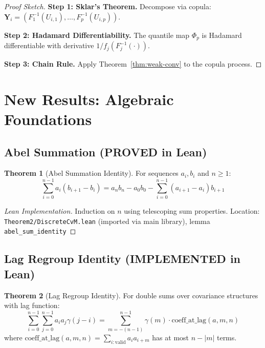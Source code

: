 \documentclass[final,3p,twocolumn,times,authoryear]{elsarticle}
\theoremstyle{definition}
\newtheorem{theorem}{Theorem}[section]
\begin{document}
\begin{proof}[Proof Sketch]
\textbf{Step 1: Sklar's Theorem.} Decompose via copula: $\mathbf{Y}_i = (F_1^{-1}(U_{i,1}), \dots, F_p^{-1}(U_{i,p}))$.

\textbf{Step 2: Hadamard Differentiability.} The quantile map $\Phi_p$ is Hadamard differentiable with derivative $1/f_j(F_j^{-1}(\cdot))$.

\textbf{Step 3: Chain Rule.} Apply Theorem~\ref{thm:weak-conv} to the copula process.
\end{proof}

\section{New Results: Algebraic Foundations}
\label{sec:new}

\subsection{Abel Summation (PROVED in Lean)}

\begin{theorem}[Abel Summation Identity]
For sequences $a_i, b_i$ and $n \geq 1$:
\begin{equation}
\sum_{i=0}^{n-1} a_i(b_{i+1} - b_i) = a_n b_n - a_0 b_0 - \sum_{i=0}^{n-1} (a_{i+1} - a_i) b_{i+1}
\end{equation}
\end{theorem}

\begin{proof}[Lean Implementation]
Induction on $n$ using telescoping sum properties. Location: \texttt{Theorem2/DiscreteCvM.lean} (imported via main library), lemma \texttt{abel\_sum\_identity}
\end{proof}

\subsection{Lag Regroup Identity (IMPLEMENTED in Lean)}

\begin{theorem}[Lag Regroup Identity]
\label{thm:lag-regroup}
For double sums over covariance structures with lag function:
\begin{equation}
\sum_{i=0}^{n-1} \sum_{j=0}^{n-1} a_i a_j \gamma(j-i) = \sum_{m=-(n-1)}^{n-1} \gamma(m) \cdot \text{coeff\_at\_lag}(a, m, n)
\end{equation}
where $\text{coeff\_at\_lag}(a, m, n) = \sum_{i: \text{valid}} a_i a_{i+m}$ has at most $n - |m|$ terms.
\end{theorem}
\end{document}
